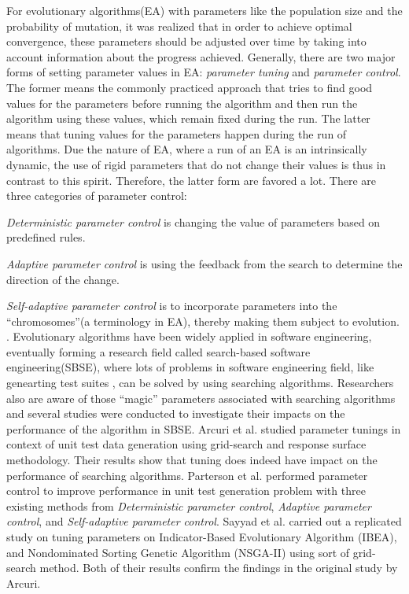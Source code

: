 For evolutionary algorithms(EA) with parameters like the population size and the probability of mutation, it was realized that in order to achieve optimal convergence, these parameters should be adjusted over time by taking into account information about the progress achieved. Generally, there are two major forms of setting parameter values in EA: {\it parameter tuning} and {\it parameter control}\cite{brest2006self}. The former means the commonly practiced approach that tries to find good values for the parameters before running the algorithm and then run the algorithm using these values, which remain fixed during the run. The latter means that tuning values for the parameters happen during the run of algorithms. Due the nature of EA, where a run of an EA is an intrinsically dynamic, the use of rigid parameters that do not change their values is thus in contrast to this spirit\cite{eiben1999parameter}. Therefore,  the latter form are favored a lot. There are three categories of parameter control\cite{eiben1999parameter}:
\bi
\item {\it Deterministic parameter control} is changing the value of parameters based on predefined rules\cite{Fogarty1989}.
\item {\it Adaptive parameter control} is using the feedback from the search to determine the direction of the change\cite{schraudolph1992dynamic,shaefer1987argot}.
\item {\it Self-adaptive parameter control} is to incorporate parameters into the ``chromosomes''(a terminology in EA), thereby making them subject to evolution\cite{brest2006self,qin2005self,omran2005self,yang2008self}.
\ei.
Evolutionary algorithms have been widely applied in software engineering, eventually forming a research field called search-based software engineering(SBSE)\cite{harman2009search}, where lots of problems in software
engineering field, like genearting
test suites \cite{ali2010systematic}, can be solved
by using searching algorithms. Researchers also are aware of those ``magic'' parameters associated with searching algorithms and several studies were conducted to investigate their impacts on the performance of the algorithm in SBSE. Arcuri et al. \cite{arcuri2013parameter} studied parameter tunings in context of unit test data 
generation using grid-search and response surface methodology.
Their results show that tuning does indeed have impact on the performance of searching algorithms. Parterson et al.\cite{paterson2015parameter} performed parameter control to improve performance in unit
test generation problem with three existing methods from {\it Deterministic parameter control}, {\it Adaptive parameter control}, and {\it Self-adaptive parameter control}. Sayyad et al. \cite{sayyad2013parameter} carried out a replicated study on tuning
parameters on Indicator-Based Evolutionary Algorithm (IBEA), and Nondominated Sorting Genetic Algorithm (NSGA-II) using sort of grid-search method. Both of their results confirm the findings in the original study by Arcuri.

